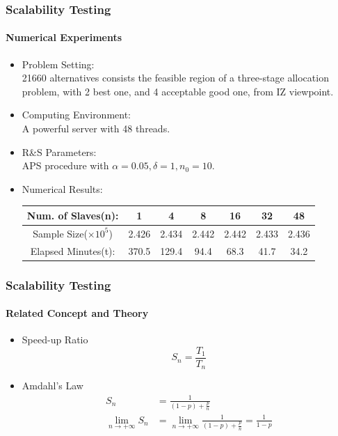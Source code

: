 \documentclass{beamer}
\begin{document}
\begin{frame}
\frametitle{Scalability Testing}
\framesubtitle{Numerical Experiments}
\begin{itemize}
\item {Problem Setting: } \\ 21660 alternatives consists the feasible region of a three-stage allocation problem, with 2 best one, and 4 acceptable good one, from IZ viewpoint.
\vspace{\baselineskip}
\item {Computing Environment: } \\ A powerful server with 48 threads.
\vspace{\baselineskip}
\item {R\&S Parameters: } \\ APS procedure with $\alpha=0.05, \delta=1, n_0 = 10$.
\vspace{\baselineskip}
\item {Numerical Results: }
\begin{table}[ht]
\begin{center}
\scalebox{0.85}
{
\begin{tabular}{|c|c|c|c|c|c|c|}
\hline
Num. of Slaves(n): & 1 & 4 & 8 & 16 & 32 & 48 \\
\hline
Sample Size($\times 10^5$) & 2.426 & 2.434 & 2.442 & 2.442 & 2.433 & 2.436\\
\hline
Elapsed Minutes(t): & 370.5 & 129.4 & 94.4 & 68.3 & 41.7 & 34.2 \\
\hline
\end{tabular}
}
\end{center}
\end{table}
\end{itemize}
\end{frame}

\begin{frame}
\frametitle{Scalability Testing}
\framesubtitle{Related Concept and Theory}
\begin{itemize}
\item Speed-up Ratio
$$ S_n = \frac{T_1}{T_n} $$
\item Amdahl's Law
\begin{align*}
S_n & = \frac{1}{(1 - p) + \frac{p}{n}} \\
\lim_{n \to +\infty} S_n & = \lim_{n \to +\infty} \frac{1}{(1 - p) + \frac{p}{n}} = \frac{1}{1 - p}
\end{align*}
\end{itemize}
\end{frame}
\end{document}
